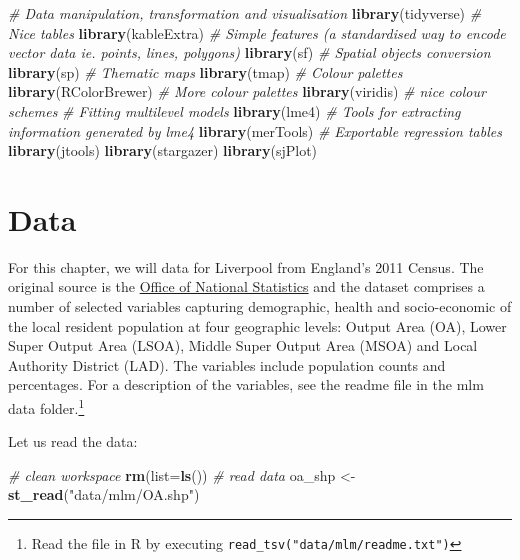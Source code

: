 \documentclass[
]{book}
\newenvironment{Shaded}{\begin{snugshade}}{\end{snugshade}}
\newcommand{\CommentTok}[1]{\textcolor[rgb]{0.56,0.35,0.01}{\textit{#1}}}
\newcommand{\DataTypeTok}[1]{\textcolor[rgb]{0.13,0.29,0.53}{#1}}
\newcommand{\KeywordTok}[1]{\textcolor[rgb]{0.13,0.29,0.53}{\textbf{#1}}}
\newcommand{\NormalTok}[1]{#1}
\newcommand{\StringTok}[1]{\textcolor[rgb]{0.31,0.60,0.02}{#1}}
\begin{document}
\begin{Shaded}
\begin{Highlighting}[]
\CommentTok{# Data manipulation, transformation and visualisation}
\KeywordTok{library}\NormalTok{(tidyverse)}
\CommentTok{# Nice tables}
\KeywordTok{library}\NormalTok{(kableExtra)}
\CommentTok{# Simple features (a standardised way to encode vector data ie. points, lines, polygons)}
\KeywordTok{library}\NormalTok{(sf) }
\CommentTok{# Spatial objects conversion}
\KeywordTok{library}\NormalTok{(sp) }
\CommentTok{# Thematic maps}
\KeywordTok{library}\NormalTok{(tmap) }
\CommentTok{# Colour palettes}
\KeywordTok{library}\NormalTok{(RColorBrewer) }
\CommentTok{# More colour palettes}
\KeywordTok{library}\NormalTok{(viridis) }\CommentTok{# nice colour schemes}
\CommentTok{# Fitting multilevel models}
\KeywordTok{library}\NormalTok{(lme4)}
\CommentTok{# Tools for extracting information generated by lme4}
\KeywordTok{library}\NormalTok{(merTools)}
\CommentTok{# Exportable regression tables}
\KeywordTok{library}\NormalTok{(jtools)}
\KeywordTok{library}\NormalTok{(stargazer)}
\KeywordTok{library}\NormalTok{(sjPlot)}
\end{Highlighting}
\end{Shaded}

\hypertarget{data-4}{%
\section{Data}\label{data-4}}

For this chapter, we will data for Liverpool from England's 2011 Census. The original source is the \href{https://www.nomisweb.co.uk/home/census2001.asp}{Office of National Statistics} and the dataset comprises a number of selected variables capturing demographic, health and socio-economic of the local resident population at four geographic levels: Output Area (OA), Lower Super Output Area (LSOA), Middle Super Output Area (MSOA) and Local Authority District (LAD). The variables include population counts and percentages. For a description of the variables, see the readme file in the mlm data folder.\footnote{Read the file in R by executing \texttt{read\_tsv("data/mlm/readme.txt")}}

Let us read the data:

\begin{Shaded}
\begin{Highlighting}[]
\CommentTok{# clean workspace}
\KeywordTok{rm}\NormalTok{(}\DataTypeTok{list=}\KeywordTok{ls}\NormalTok{())}
\CommentTok{# read data}
\NormalTok{oa_shp <-}\StringTok{ }\KeywordTok{st_read}\NormalTok{(}\StringTok{"data/mlm/OA.shp"}\NormalTok{)}
\end{Highlighting}
\end{Shaded}
\end{document}

